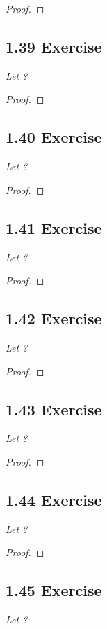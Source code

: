 \documentclass{article}
\begin{document}
\begin{proof}
\end{proof}

\subsection*{1.39 Exercise} 
\quad \textit{Let ?}

\begin{proof}
\end{proof}

\subsection*{1.40 Exercise} 
\quad \textit{Let ?}

\begin{proof}
\end{proof}

\subsection*{1.41 Exercise} 
\quad \textit{Let ?}

\begin{proof}
\end{proof}

\subsection*{1.42 Exercise} 
\quad \textit{Let ?}

\begin{proof}
\end{proof}

\subsection*{1.43 Exercise} 
\quad \textit{Let ?}

\begin{proof}
\end{proof}

\subsection*{1.44 Exercise} 
\quad \textit{Let ?}

\begin{proof}
\end{proof}

\subsection*{1.45 Exercise} 
\quad \textit{Let ?}
\end{document}
